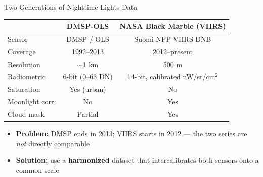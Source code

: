 \documentclass[dvipsnames,hyperref={pdfpagelabels=false}]{beamer}
\begin{document}
\begin{frame}{Two Generations of Nighttime Lights Data}
\begin{center}
\small
\begin{tabular}{lcc}
  \toprule
  & \textbf{DMSP-OLS} & \textbf{NASA Black Marble (VIIRS)} \\
  \midrule
  Sensor        & DMSP / OLS      & Suomi-NPP VIIRS DNB \\
  Coverage      & 1992–2013       & 2012–present \\
  Resolution    & $\sim$1 km      & 500 m \\
  Radiometric   & 6-bit (0–63 DN) & 14-bit, calibrated nW/sr/cm$^2$ \\
  Saturation    & Yes (urban)     & No \\
  Moonlight corr.& No             & Yes \\
  Cloud mask    & Partial         & Yes \\
  \bottomrule
\end{tabular}
\end{center}
\vspace{0.2cm}
\begin{itemize}
  \item \textbf{Problem:} DMSP ends in 2013; VIIRS starts in 2012
        --- the two series are \emph{not} directly comparable
  \vspace{0.15cm}
  \item \textbf{Solution:} use a \textbf{harmonized} dataset that
        intercalibrates both sensors onto a common scale
\end{itemize}
\end{frame}
\end{document}
